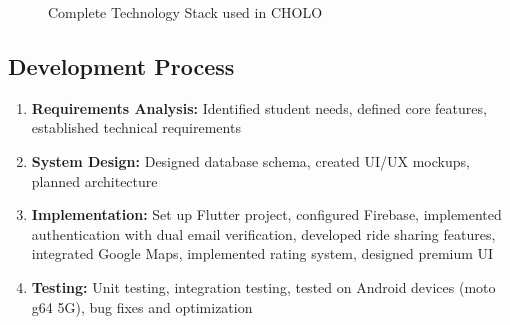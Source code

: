 \documentclass[12pt,a4paper]{article}
\begin{document}
\begin{figure}[H]
    \centering
    \caption{Complete Technology Stack used in CHOLO}
    \label{fig:techstack}
\end{figure}

\subsection{Development Process}

\begin{enumerate}
    \item \textbf{Requirements Analysis:} Identified student needs, defined core features, established technical requirements
    \item \textbf{System Design:} Designed database schema, created UI/UX mockups, planned architecture
    \item \textbf{Implementation:} Set up Flutter project, configured Firebase, implemented authentication with dual email verification, developed ride sharing features, integrated Google Maps, implemented rating system, designed premium UI
    \item \textbf{Testing:} Unit testing, integration testing, tested on Android devices (moto g64 5G), bug fixes and optimization
\end{enumerate}
\end{document}
